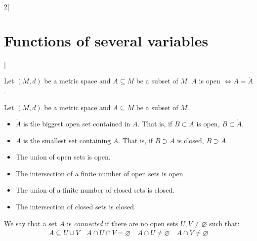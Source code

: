 \documentclass[../../../main.tex]{subfiles}
\begin{document}
\begin{multicols}{2}[\section{Functions of several variables}]
  \begin{proposition}
    Let $(M,d)$ be a metric space and $A\subseteq M$ be a subset of $M$. $A$ is open $\iff A=\mathring A$.
  \end{proposition}
  \begin{proposition}
    Let $(M,d)$ be a metric space and $A\subseteq M$ be a subset of $M$.
    \begin{itemize}
      \item $\mathring A$ is the biggest open set contained in $A$. That is, if $B\subset A$ is open, $B\subset\mathring A$.
      \item $\overline{A}$ is the smallest set containing $A$. That is, if $B\supset A$ is closed, $B\supset\overline{A}$.
    \end{itemize}
  \end{proposition}
  \begin{proposition}
    \hfill
    \begin{itemize}
      \item The union of open sets is open.
      \item The intersection of a finite number of open sets is open.
      \item The union of a finite number of closed sets is closed.
      \item The intersection of closed sets is closed.
    \end{itemize}
  \end{proposition}
  \begin{definition}
    We say that a set $A$ is \emph{connected} if there are no open sets $U,V\ne\varnothing$ such that:
    \begin{gather*}
      A\subseteq U\cup V\quad A\cap U\cap V=\varnothing\quad A\cap U\ne\varnothing\quad A\cap V\ne\varnothing
    \end{gather*}
  \end{definition}

\end{multicols}
\end{document}

